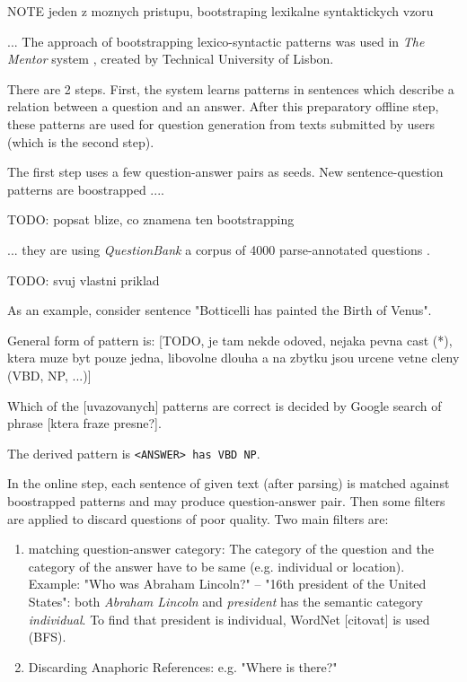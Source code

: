 \documentclass[a4paper, 12pt, twoside]{fithesis2}		%
\renewcommand{\_}{\leavevmode \kern0.0em\vbox{\hrule width0.4em}}
\begin{document}
NOTE jeden z moznych pristupu, bootstraping lexikalne syntaktickych vzoru

... The approach of bootstrapping lexico-syntactic patterns was used
in \textit{The Mentor} system \cite{mentor}, created by Technical University of Lisbon.

There are 2 steps.
First, the system learns patterns in sentences which describe a relation between a question and an answer.
After this preparatory offline step, these patterns are used for question generation from texts submitted by users (which is the second step).

The first step uses a few question-answer pairs as seeds.
New sentence-question patterns are boostrapped ....

TODO: popsat blize, co znamena ten bootstrapping

... they are using \textit{QuestionBank} a corpus of 4000 parse-annotated questions \cite{question-bank}.

TODO: svuj vlastni priklad

As an example, consider sentence "Botticelli has painted the Birth of Venus".

General form of pattern is: [TODO, je tam nekde odoved, nejaka pevna cast (*), ktera muze byt pouze jedna, libovolne dlouha a na zbytku jsou urcene vetne cleny (VBD, NP, ...)]

Which of the [uvazovanych] patterns are correct is decided by
Google search of phrase [ktera fraze presne?].

The derived pattern is \texttt{<ANSWER> has VBD NP}.



In the online step, each sentence of given text (after parsing) is matched against boostrapped patterns
and may produce question-answer pair.
Then some filters are applied to discard questions of poor quality. Two main filters are:

\begin{enumerate}
  \item matching question-answer category:
    The category of the question and the category of the answer have to be same (e.g. individual or location). Example: "Who was Abraham Lincoln?" -- "16th president of the United States": both \textit{Abraham Lincoln} and \textit{president} has the semantic category \textit{individual}.
    To find that president is individual, WordNet [citovat] is used (BFS).
  \item Discarding Anaphoric References: e.g. "Where is there?"
\end{enumerate}
\end{document}
